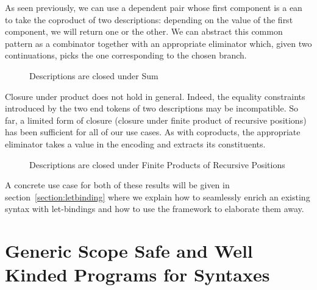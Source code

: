 As seen previously, we can use a dependent pair whose first component
is a ean to take the coproduct of two descriptions: depending
on the value of the first component, we will return one or the other.
We can abstract this common pattern as a combinator  together
with an appropriate eliminator  which, given two continuations,
picks the one corresponding to the chosen branch.

\begin{figure}[h]
\begin{minipage}{0.45\textwidth}
\end{minipage}\hspace{2em}
\begin{minipage}{0.45\textwidth}
\end{minipage}
\caption{Descriptions are closed under Sum}
\end{figure}

Closure under product does not hold in general. Indeed, the
equality constraints introduced by the two end tokens of two
descriptions may be incompatible. So far, a limited form of
closure (closure under finite product of recursive positions)
has been sufficient for all of our use cases. As with coproducts,
the appropriate eliminator  takes a value in the encoding
and extracts its constituents.

\begin{figure}[h]
\begin{minipage}{0.45\textwidth}
\end{minipage}\hspace{2em}
\begin{minipage}{0.45\textwidth}
\end{minipage}
\caption{Descriptions are closed under Finite Products of Recursive Positions}
\end{figure}

A concrete use case for both of these results will be given in section~\ref{section:letbinding}
where we explain how to seamlessly enrich an existing syntax with let-bindings
and how to use the  framework to elaborate them away.




\section{Generic Scope Safe and Well Kinded Programs for Syntaxes}\label{section:semantics}

